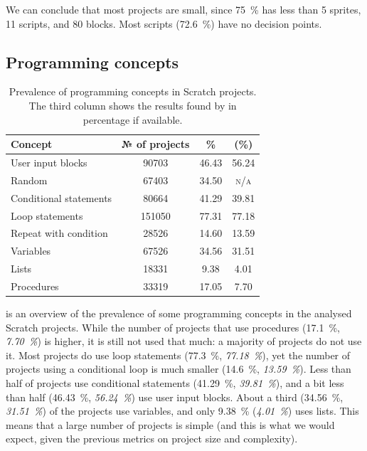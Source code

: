 \documentclass[../main]{subfiles}
\begin{document}
We can conclude that most projects are small, since \qty{75}{\percent} has less than 5 sprites, 11 scripts, and 80 blocks.
Most scripts (\qty{72.6}{\percent}) have no decision points.

\subsection{Programming concepts}\label{subsec:programming-concepts}

\begin{table}
    \centering
    \caption{
        Prevalence of programming concepts in Scratch projects.
        The third column shows the results found by \textcite{aivaloglouHowKidsCode2016} in percentage if available.
    }
    \label{tab:scratch-programming-concepts}
    \begin{tabular}{|l|S[table-format=6.0] S|S|}
        \hline
        {Concept} & {№ of projects} & \% & {\citeauthor{aivaloglouHowKidsCode2016} (\%)} \\
        \hline
        User input blocks & 90703 & 46.43 & 56.24  \\
        Random & 67403 & 34.50 & {\textsc{n/a}} \\
        \hline
        Conditional statements & 80664 & 41.29 & 39.81 \\
        Loop statements & 151050 & 77.31 & 77.18 \\
        Repeat with condition & 28526 & 14.60 & 13.59 \\
        \hline
        Variables & 67526 & 34.56 & 31.51 \\
        Lists & 18331 & 9.38 & 4.01 \\
        \hline
        Procedures & 33319 & 17.05 & 7.70 \\
        \hline
    \end{tabular}
\end{table}

 is an overview of the prevalence of some programming concepts in the analysed Scratch projects.
While the number of projects that use procedures (\qty{17.1}{\percent}, \textit{\qty{7.70}{\percent}}) is higher, it is still not used that much: a majority of projects do not use it.
Most projects do use loop statements (\qty{77.3}{\percent}, \textit{\qty{77.18}{\percent}}), yet the number of projects using a conditional loop is much smaller (\qty{14.6}{\percent}, \textit{\qty{13.59}{\percent}}).
Less than half of projects use conditional statements (\qty{41.29}{\percent}, \textit{\qty{39.81}{\percent}}), and a bit less than half (\qty{46.43}{\percent}, \textit{\qty{56.24}{\percent}}) use user input blocks.
About a third (\qty{34.56}{\percent}, \textit{\qty{31.51}{\percent}}) of the projects use variables, and only \qty{9.38}{\percent} (\textit{\qty{4.01}{\percent}}) uses lists.
This means that a large number of projects is simple (and this is what we would expect, given the previous metrics on project size and complexity).
\end{document}
